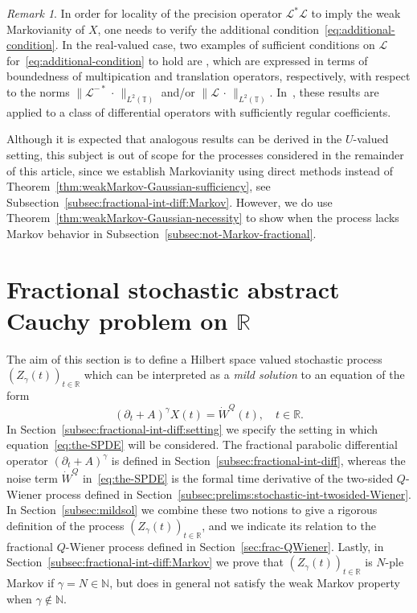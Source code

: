 \documentclass[reqno]{amsart}
\numberwithin{equation}{section}
\newcommand{\bbT}{\mathbb{T}}
\newcommand{\R}{\mathbb{R}}
\newcommand{\N}{\mathbb{N}}
\newcommand{\cL}{\mathcal{L}}
\newcommand{\norm}[2]{     \| #1       \|_{ #2 }}
\theoremstyle{remark}
\newtheorem{remark}[lemma]{Remark}
\theoremstyle{definition}
\begin{document}
%
\begin{remark}
	In order for
	locality of the precision operator $\cL^*\cL$ to imply
	the weak Markovianity of $X$,
	one needs to verify
	the additional condition~\eqref{eq:additional-condition}.
	In the real-valued case, 
	two examples of sufficient conditions on $\cL$ for~\eqref{eq:additional-condition}
	to hold are \cite[Lemmas~1 and~2, pp.~108--111]{Rozanov1982},
	which are expressed in terms of boundedness of multipication and translation operators,
	respectively, with respect to the norms $\norm{\cL^{-*}\,\cdot\,}{L^2(\bbT)}$
	and/or $\norm{\cL\,\cdot\,}{L^2(\bbT)}$.
	In~\cite[Chapter~3, Section~3.2]{Rozanov1982}, these results are applied
	to a class of differential operators with sufficiently regular coefficients.
	
	Although it is expected that analogous results can be derived in the $U$-valued setting,
	this subject is out of scope for the processes considered in the remainder of this article,
	since we establish Markovianity using direct methods instead of Theorem~\ref{thm:weakMarkov-Gaussian-sufficiency}, 
	see Subsection~\ref{subsec:fractional-int-diff:Markov}.
	However, we do use Theorem~\ref{thm:weakMarkov-Gaussian-necessity} 
	to show when the process lacks Markov behavior in Subsection~\ref{subsec:not-Markov-fractional}.
\end{remark}

\section{Fractional stochastic abstract Cauchy problem on $\R$}
\label{sec:frac-stoch-ACP-R}
The aim of this section is to define a Hilbert space valued stochastic process $(Z_\gamma(t))_{t\in \R}$
which can be interpreted as a \emph{mild solution} to an equation of the form
%
\begin{equation}\label{eq:the-SPDE}
	(\partial_t + A)^\gamma X(t) = \dot W^Q(t), \quad t \in \R.
\end{equation}
%
In Section~\ref{subsec:fractional-int-diff:setting} we specify the setting in which equation~\eqref{eq:the-SPDE} will be considered.
The fractional parabolic differential operator 
$(\partial_t + A)^\gamma$ is defined in Section~\ref{subsec:fractional-int-diff},
whereas
the noise term $\dot W^Q$ in~\eqref{eq:the-SPDE} is the formal
time derivative of the two-sided $Q$-Wiener process defined in Section~\ref{subsec:prelims:stochastic-int-twosided-Wiener}.
In Section~\ref{subsec:mildsol} we combine these two notions to 
give a rigorous definition of the process $(Z_\gamma(t))_{t\in \R}$,
and we indicate its relation to the fractional $Q$-Wiener process defined in Section~\ref{sec:frac-QWiener}.
Lastly, in Section~\ref{subsec:fractional-int-diff:Markov}
we prove that $(Z_\gamma(t))_{t\in \R}$ is $N$-ple Markov if $\gamma = N \in \N$,
but does in general not satisfy the weak Markov property when $\gamma \not\in \N$.
\end{document}
